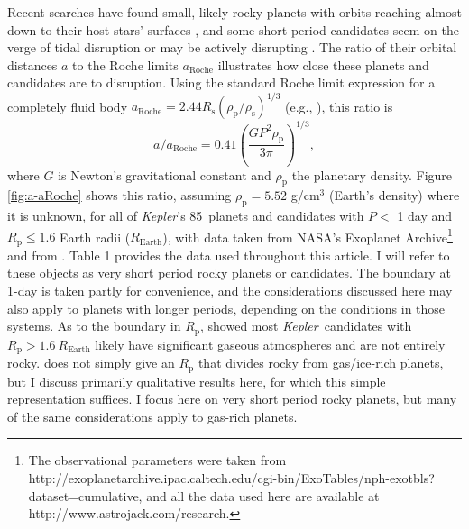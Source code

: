 \documentclass[smallcondensed]{svjour3}    %
\newcommand{\NumSmallKeplerPlanetsPleOne}{85}
\newcommand{\kepler}{\emph{Kepler}}
\begin{document}
Recent searches have found small, likely rocky planets with orbits reaching almost down to their host stars' surfaces \cite{2013A&A...555A..58O, 2013MNRAS.429.2001H, 2013ApJ...773L..15R, 2013ApJ...774...54S, 2013ApJ...779..165J}, and some short period candidates seem on the verge of tidal disruption or may be actively disrupting \cite{2012ApJ...752....1R, 2013arXiv1312.2054R}. The ratio of their orbital distances $a$ to the Roche limits $a_\mathrm{Roche}$ illustrates how close these planets and candidates are to disruption. Using the standard Roche limit expression for a completely fluid body $a_\mathrm{Roche} = 2.44 R_\mathrm{s} \left(\rho_\mathrm{p}/\rho_\mathrm{s}\right)^{1/3}$ (e.g., \cite{1959cbs..book.....K}), this ratio is
\begin{equation} 
a/a_\mathrm{Roche} = 0.41 \left( \frac{G P^2 \rho_\mathrm{p}}{3\pi} \right)^{1/3},
\label{eqn:aRoche_period}
\end{equation}
where $G$ is Newton's gravitational constant and $\rho_\mathrm{p}$ the planetary density. Figure \ref{fig:a-aRoche} shows this ratio, assuming $\rho_\mathrm{p} = 5.52$ g/cm$^3$ (Earth's density) where it is unknown, for all of \kepler's \NumSmallKeplerPlanetsPleOne~planets and candidates with $P <$ 1 day and $R_\mathrm{p} \le 1.6$ Earth radii ($R_\mathrm{Earth}$), with data taken from NASA's Exoplanet Archive\footnote{The observational parameters were taken from http://exoplanetarchive.ipac.caltech.edu/cgi-bin/ExoTables/nph-exotbls?dataset=cumulative, and all the data used here are available at http://www.astrojack.com/research.} and from \cite{2013ApJ...779..165J}. Table 1 provides the data used throughout this article. I will refer to these objects as very short period rocky planets or candidates. The boundary at 1-day is taken partly for convenience, and the considerations discussed here may also apply to planets with longer periods, depending on the conditions in those systems. As to the boundary in $R_\mathrm{p}$, \cite{Rogers_2014} showed most \kepler~candidates with $R_\mathrm{p} > 1.6\ R_\mathrm{Earth}$ likely have significant gaseous atmospheres and are not entirely rocky. \cite{Rogers_2014} does not simply give an $R_\mathrm{p}$ that divides rocky from gas/ice-rich planets, but I discuss primarily qualitative results here, for which this simple representation suffices. I focus here on very short period rocky planets, but many of the same considerations apply to gas-rich planets.

\end{document}
